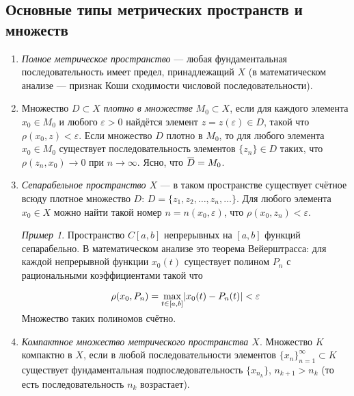 \documentclass[12pt,a4paper,titlepage,oneside]{book}
\newcommand{\overbar}[1]{\mkern 1.5mu\overline{\mkern-1.5mu#1\mkern-1.5mu}\mkern 1.5mu}
\theoremstyle{definition}
\theoremstyle{plain}
\theoremstyle{break}
\theoremstyle{remark}
\theoremstyle{remark}
\newtheorem*{example}{Пример}
\theoremstyle{remark}
\theoremstyle{remark}
\theoremstyle{plain}
\theoremstyle{plain}
\begin{document}
\subsection*{Основные типы метрических пространств и множеств}

\begin{enumerate}

	\item \textit{Полное метрическое пространство} --- любая фундаментальная последовательность имеет предел, принадлежащий $X$ (в математическом анализе --- признак Коши сходимости числовой последовательности).

	\item Множество $D \subset X$ \textit{плотно в множестве} $ M_0 \subset X$, если для каждого элемента $x_0 \in M_0$ и любого $\varepsilon > 0$ найдётся элемент $z = z(\varepsilon) \in D$, такой что $\rho(x_0, z) < \varepsilon$. Если множество $D$ плотно в $M_0$, то для любого элемента $x_0 \in  M_0$ существует последовательность элементов $\lbrace z_n \rbrace \in D$ таких, что $\rho(z_n, x_0) \to 0$ при $n \to \infty$. Ясно, что $\overbar{D} = M_0$.

	\item \textit{Сепарабельное пространство $X$} --- в таком пространстве существует счётное всюду плотное множество $D$: $D=\lbrace z_1,z_2,\ldots,z_n,\ldots \rbrace$. Для любого элемента $x_0 \in X$ можно найти такой номер $n = n(x_0,\varepsilon)$, что $\rho(x_0, z_n) < \varepsilon$.

	\begin{example}	
	Пространство $C[a,b]$ непрерывных на $[a,b]$ функций сепарабельно. В математическом анализе это теорема Вейерштрасса: для каждой непрерывной функции $x_0(t)$ существует полином $P_n$ с рациональными коэффициентами такой что
	
	\begin{equation*}
	\rho(x_0, P_n)=\smash{\displaystyle\max_{t \in [a,b]}}  \vert x_0(t)-P_n(t) \vert  < \varepsilon
	\end{equation*}

	Множество таких полиномов счётно.
	\end{example}

	\item \textit{Компактное множество метрического пространства $X$}. Множество $K$ компактно в $X$, если в любой последовательности элементов $\lbrace x_n \rbrace_{n=1}^{\infty} \subset K$ существует фундаментальная подпоследовательность $\lbrace x_{n_k} \rbrace$, $n_{k+1}>n_k$ (то есть последовательность $n_k$ возрастает).

\end{enumerate}
\end{document}

